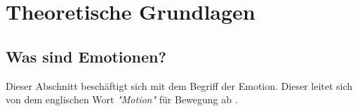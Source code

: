\section{Theoretische Grundlagen}
\subsection{Was sind Emotionen?}
Dieser Abschnitt beschäftigt sich mit dem Begriff der Emotion. Dieser leitet sich von dem englischen Wort \textit{"Motion"}
für Bewegung ab \cite{Sch13}.